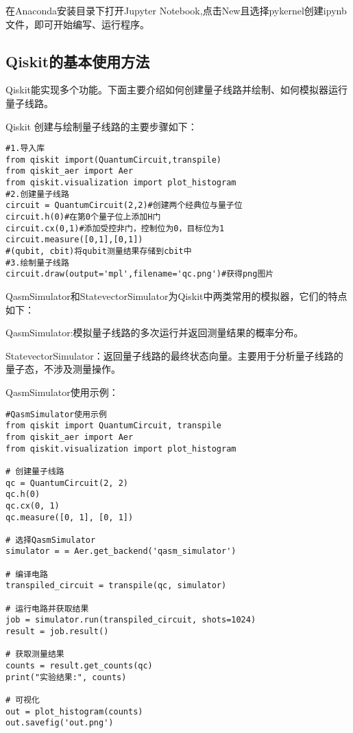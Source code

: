 在Anaconda安装目录下打开Jupyter Notebook,点击New且选择pykernel创建ipynb文件，即可开始编写、运行程序。
\subsection{Qiskit的基本使用方法}
Qiskit能实现多个功能。下面主要介绍如何创建量子线路并绘制、如何模拟器运行量子线路。


Qiskit 创建与绘制量子线路的主要步骤如下：

\begin{py}
\begin{lstlisting}
#1.导入库
from qiskit import(QuantumCircuit,transpile)
from qiskit_aer import Aer
from qiskit.visualization import plot_histogram
#2.创建量子线路
circuit = QuantumCircuit(2,2)#创建两个经典位与量子位
circuit.h(0)#在第0个量子位上添加H门
circuit.cx(0,1)#添加受控非门，控制位为0，目标位为1
circuit.measure([0,1],[0,1])
#(qubit, cbit)将qubit测量结果存储到cbit中
#3.绘制量子线路
circuit.draw(output='mpl',filename='qc.png')#获得png图片
\end{lstlisting}
\end{py}


QasmSimulator和StatevectorSimulator为Qiskit中两类常用的模拟器，它们的特点如下：
\begin{paralist}
    \item QasmSimulator:模拟量子线路的多次运行并返回测量结果的概率分布。
    \item StatevectorSimulator：返回量子线路的最终状态向量。主要用于分析量子线路的量子态，不涉及测量操作。
\end{paralist}

QasmSimulator使用示例：
\begin{py}
\begin{lstlisting}
#QasmSimulator使用示例
from qiskit import QuantumCircuit, transpile
from qiskit_aer import Aer
from qiskit.visualization import plot_histogram

# 创建量子线路
qc = QuantumCircuit(2, 2)
qc.h(0)
qc.cx(0, 1)
qc.measure([0, 1], [0, 1])

# 选择QasmSimulator
simulator = = Aer.get_backend('qasm_simulator')

# 编译电路
transpiled_circuit = transpile(qc, simulator)

# 运行电路并获取结果
job = simulator.run(transpiled_circuit, shots=1024)
result = job.result()

# 获取测量结果
counts = result.get_counts(qc)
print("实验结果:", counts)

# 可视化
out = plot_histogram(counts)
out.savefig('out.png')
\end{lstlisting}
\end{py}

